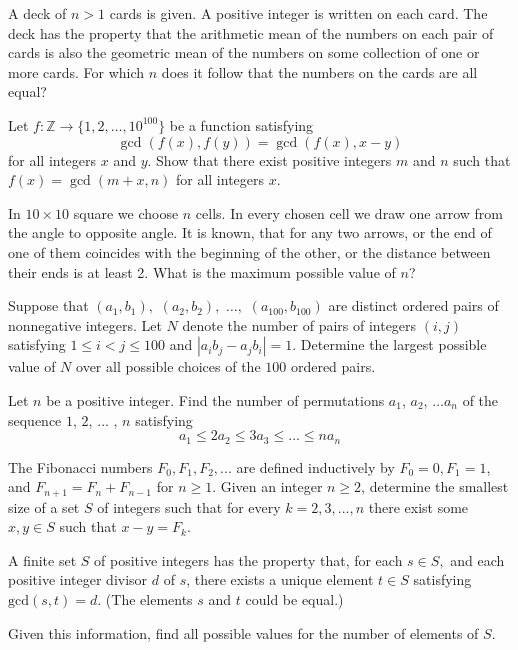 \documentclass[11pt]{scrartcl}
\begin{document}
\begin{problem}[3859961452154270883]
	A deck of $n > 1$ cards is given. A positive integer is written on each card. The deck has the property that the arithmetic mean of the numbers on each pair of cards is also the geometric mean of the numbers on some collection of one or more cards.
For which $n$ does it follow that the numbers on the cards are all equal?
\end{problem}
\begin{problem}[461803484803557]
	Let $f: \mathbb Z\to \{1, 2, \dots, 10^{100}\}$ be a function satisfying
$$\gcd(f(x), f(y)) = \gcd(f(x), x-y)$$for all integers $x$ and $y$. Show that there exist positive integers $m$ and $n$ such that $f(x) = \gcd(m+x, n)$ for all integers $x$.
\end{problem}
\begin{problem}[5949258338135822858]
In $10\times 10$ square we choose $n$ cells. In every chosen cell we draw one arrow from the angle to opposite angle. It is known, that for any two arrows, or the end of one of them coincides with the beginning of the other, or
the distance between their ends is at least 2. What is the maximum possible value of $n$?
\end{problem}
\begin{problem}[2556841339462610604]
	Suppose that $(a_1,b_1),$ $(a_2,b_2),$ $\dots,$ $(a_{100},b_{100})$ are distinct ordered pairs of nonnegative integers. Let $N$ denote the number of pairs of integers $(i,j)$ satisfying $1\leq i<j\leq 100$ and $|a_ib_j-a_jb_i|=1$. Determine the largest possible value of $N$ over all possible choices of the $100$ ordered pairs.
\end{problem}
\begin{problem}[233559801569582]
Let $n$ be a positive integer. Find the number of permutations $a_1$, $a_2$, $\dots a_n$ of the
sequence $1$, $2$, $\dots$ , $n$ satisfying
$$a_1 \le 2a_2\le 3a_3 \le \dots \le na_n$$
\end{problem}
\begin{problem}[6978535805224432571]
	The Fibonacci numbers $F_0, F_1, F_2, . . .$ are defined inductively by $F_0=0, F_1=1$, and $F_{n+1}=F_n+F_{n-1}$ for $n \ge 1$. Given an integer $n \ge 2$, determine the smallest size of a set $S$ of integers such that for every $k=2, 3, . . . , n$ there exist some $x, y \in S$ such that $x-y=F_k$.
\end{problem}
\begin{problem}[770421031902562]
A finite set $S$ of positive integers has the property that, for each $s \in S,$ and each positive integer divisor $d$ of $s$, there exists a unique element $t \in S$ satisfying $\text{gcd}(s, t) = d$. (The elements $s$ and $t$ could be equal.)

Given this information, find all possible values for the number of elements of $S$.
\end{problem}
\end{document}

